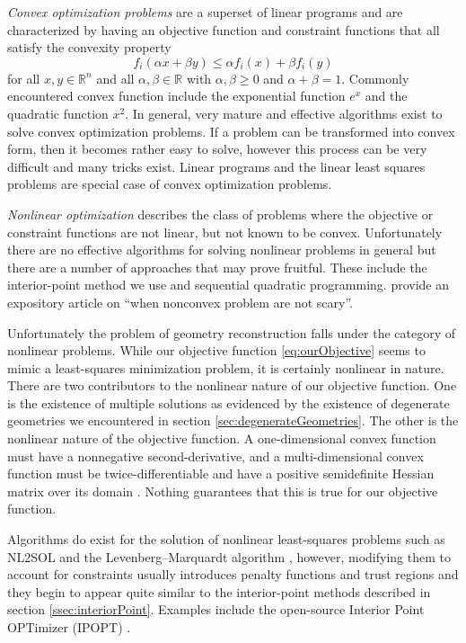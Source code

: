 \emph{Convex optimization problems} are a superset of linear programs and are characterized by having an objective function and constraint functions that all satisfy the convexity property
\begin{equation}
f_i(\alpha x + \beta y) \le \alpha f_i(x) + \beta f_i(y)
\end{equation}
for all $x,y \in \mathbb{R}^n$ and all $\alpha, \beta \in \mathbb{R}$ with $\alpha, \beta \ge 0$ and $\alpha + \beta = 1$. Commonly encountered convex function include the exponential function $e^x$ and the quadratic function $x^2$. In general, very mature and effective algorithms exist to solve convex optimization problems. If a problem can be transformed into convex form, then it becomes rather easy to solve, however this process can be very difficult and many tricks exist. Linear programs and the linear least squares problems are special case of convex optimization problems.

\emph{Nonlinear optimization} describes the class of problems where the objective or constraint functions are not linear, but not known to be convex. Unfortunately there are no effective algorithms for solving nonlinear problems in general but there are a number of approaches that may prove fruitful. These include the interior-point method we use and sequential quadratic programming. \citet{Sun15} provide an expository article on ``when nonconvex problem are not scary''.

Unfortunately the problem of geometry reconstruction falls under the category of nonlinear problems. While our objective function \eqref{eq:ourObjective} seems to mimic a least-squares minimization problem, it is certainly nonlinear in nature. There are two contributors to the nonlinear nature of our objective function. One is the existence of multiple solutions as evidenced by the existence of degenerate geometries we encountered in section \ref{sec:degenerateGeometries}. The other is the nonlinear nature of the objective function. A one-dimensional convex function must have a nonnegative second-derivative, and a multi-dimensional convex function must be twice-differentiable and have a positive semidefinite Hessian matrix over its domain \citep[p. 71]{Boyd04}. Nothing guarantees that this is true for our objective function.

Algorithms do exist for the solution of nonlinear least-squares problems such as NL2SOL \citep{Dennis81} and the Levenberg–Marquardt algorithm \citep{Pujol07}, however, modifying them to account for constraints usually introduces penalty functions and trust regions and they begin to appear quite similar to the interior-point methods described in section \ref{ssec:interiorPoint}. Examples include the open-source Interior Point OPTimizer (IPOPT) \citep{Branch99}.


